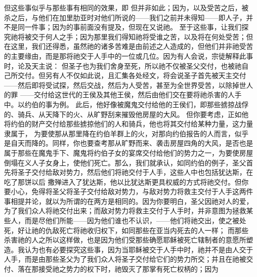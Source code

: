   但这些事似乎与那些事有相同的效果，即  但并非如此；因为，以及受苦之后，被杀之后，与他们在加里肋亚时对他们所说的——我们之前并未得知——即人子，并不是同一件事；因为的事前面没有提及，但现在又说祂。 至于这些事，让我们探究祂将被交于何人之手；因为那里我们得知祂将受谁之苦，以及将在何处受苦；但在这里，我们还得悉，虽然祂的诸多苦难是由前述之人造成的，但他们并非祂受苦的主要缘由，而是那将祂交于人手中的一位或几位。因为有人会说，宗徒解释此事时，论及天主说：  但圣子也为我们舍身至死，所以祂不仅被圣父交付，也被祂自己所交付。但另有人不仅如此说，且汇集各处经文，将会说圣子首先被天主交付——然后即将受试探，然后交战，然后为人受苦，甚至为全世界受苦，以除掉世人的罪  ——交付给这世代的王侯及其他王侯，然后由他们交在要将祂杀害的人手中。以约伯的事为例。  此后，他好像被魔鬼交付给他的王侯们，即那些掳掠战俘的、骑兵、从天降下的火、从旷野刮来摧毁他房屋的大风。 但你要考虑，正如他将约伯的财产交付给那些掳掠他们的人和骑兵，他也将其交付给某种力量，这力量隶属于， 为要使那从那里降在约伯羊群上的火，对那向约伯报告的人而言，似乎是自天而降的。同样，你也要查考那从旷野而来、袭击房屋四角的大风，是否也是属于那些在魔鬼手下、魔鬼将约伯子女的宴席交付给他们的势力之一，为要使房屋倒塌在义人子女身上，使他们死亡。那么，我们就承认，如同约伯的例子，圣父首先将圣子交付给敌对势力，然后他们将祂交付于人手，这些人中也包括犹达斯，在吃了那饼以后  撒殚进入了犹达斯，他以比犹达斯更具权威的方式将祂交付。但你要小心，免得将圣父将圣子交付给敌对势力，与敌对势力将救主交付于人手这两件事相提并论，就以为所谓的在两方是相同的。因为你要明白，圣父因祂对人的爱，为了我们众人将祂交付出来；而敌对势力将救主交付于人手时，并非意图为拯救某些人，而是尽他们所能——因为他们谁也不认识，——他们将祂交出，使之被处死，好让祂的仇敌死亡将祂收归权下，如同那些在亚当内死去的人一样； 而那些杀害祂的人之所以这样做，也是因为他们受那些确愿耶稣被死亡辖制者的意愿所塑造。我认为也有必要探究这些事，因为当耶稣被交于人手中时，祂并不是由人交于人手，而是由那些圣父为了我们众人将圣子交付给它们的势力所交；并且在祂被交付、落在那接受祂之势力的权下时，祂毁灭了那掌有死亡权柄的；因为 \par

